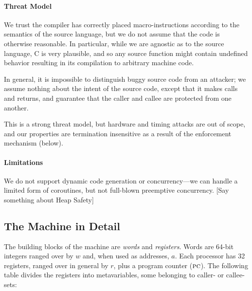 \documentclass[10pt,conference]{ieeetran}%
\theoremstyle{definition}
\begin{document}

\paragraph*{Threat Model}

We trust the compiler has correctly placed macro-instructions according to
the semantics of the source language, but we do not assume that the code
is otherwise reasonable. In particular, while we are agnostic as to the source
language, C is very plausible, and so any source function might contain undefined
behavior resulting in its compilation to arbitrary machine code.

In general, it is impossible to distinguish buggy source code from an attacker;
we assume nothing about the intent of the source code, except that it makes calls
and returns, and guarantee that the caller and callee are protected from one
another.

This is a strong threat model, but hardware and timing attacks are out of scope,
and our properties are termination insensitive as a result of the enforcement mechanism
(below).

\paragraph*{Limitations}

We do not support dynamic code generation or concurrency---we can handle a
limited form of coroutines, but not full-blown preemptive concurrency.
[Say something about Heap Safety]

\subsection{The Machine in Detail}
\label{sec:prelim}

The building blocks of the machine are {\em words} and {\em registers}.
Words are 64-bit integers ranged over by \(w\) and, when used as addresses,
\(a\). Each processor has 32 registers, ranged over in general by \(r\),
plus a program counter (\(\textsc{pc}\)). The following table divides
the registers into metavariables, some belonging to caller- or callee- sets:
\end{document}
